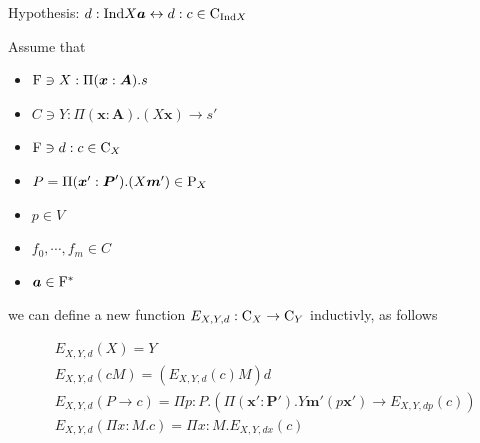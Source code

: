 Hypothesis: $d : \mathrm{Ind} X \boldsymbol{a} \leftrightarrow d : c \in \mathrm{C}_{\mathrm{Ind} X}$


Assume that 

\begin{itemize}
  \item $\mathrm{F} \ni X : \Pi (\boldsymbol{x}: \boldsymbol{A}).s $
  \item $C \ni Y :  \Pi (\bm x: \bm A).(X \bm x) \to s'$
  \item $\mathrm{F} \ni d : c \in \mathrm{C}_X$
  \item $P = \Pi(\boldsymbol{x}' : \boldsymbol{P}') . (X \boldsymbol{m}') \in \mathrm{P}_X$
  \item $p \in V$
  \item $f_0, \cdots, f_m \in C$
  \item $\boldsymbol{a} \in \mathrm{F}^*$
\end{itemize}
we can define a new function $E_{X, Y, d} : \mathrm{C}_X \to \mathrm{C}_Y$ inductivly, as follows



\begin{align*}
  & E_{X, Y, d}(X) = Y \\ 
  & E_{X, Y, d}(c M) = (E_{X, Y, d}(c) M) d \\
  & E_{X, Y, d}(P \to c) = \Pi p : P . (\Pi (\bm x' : \bm P') . Y \bm m' (p \bm x')  \to E_{X, Y, d p} (c)) \\
  & E_{X, Y, d}(\Pi x : M. c) = \Pi x : M . E_{X, Y, d x}(c)
\end{align*}








% 
% 
% 





